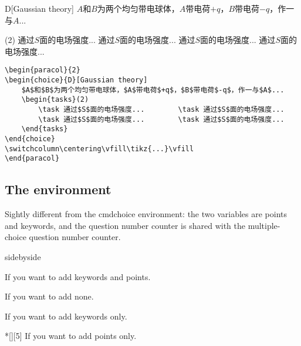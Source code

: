 \begin{paracol}{2}
    \begin{choice}{D}[Gaussian theory]
        $A$和$B$为两个均匀带电球体，$A$带电荷$+q$，$B$带电荷$-q$，作一与$A$...
        \begin{tasks}(2)
            \task 通过$S$面的电场强度...        \task 通过$S$面的电场强度...
            \task 通过$S$面的电场强度...        \task 通过$S$面的电场强度...
        \end{tasks}
    \end{choice}
    \switchcolumn
    \centering\vfill
    \vfill
\end{paracol}
\begin{verbatim}
\begin{paracol}{2}
\begin{choice}{D}[Gaussian theory]
    $A$和$B$为两个均匀带电球体，$A$带电荷$+q$，$B$带电荷$-q$，作一与$A$...
    \begin{tasks}(2)
        \task 通过$S$面的电场强度...        \task 通过$S$面的电场强度...
        \task 通过$S$面的电场强度...        \task 通过$S$面的电场强度...
    \end{tasks}
\end{choice}
\switchcolumn\centering\vfill\tikz{...}\vfill
\end{paracol}
\end{verbatim}

\subsection{The  environment}
Sightly different from the cmd{choice} environment: the two variables are points and keywords, and the question number counter is shared with the multiple-choice question number counter.
\begin{tcblisting}{sidebyside}
    \begin{problem}[Keywords][5]
        If you want to add keywords and points.
    \end{problem}
    \begin{problem}
        If you want to add none.
    \end{problem}
    \begin{problem}[Keywords]
        If you want to add keywords only.
    \end{problem}
    \begin{problem}*[][5]
        If you want to add points only.
    \end{problem}
\end{tcblisting}

